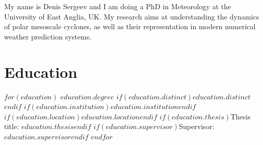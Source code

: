 \documentclass[]{deedy-resume-openfont}
\begin{document}
\lastupdated

\begin{minipage}[t]{\textwidth}
My name is Denis Sergeev and I am doing a PhD in Meteorology at the University of East Anglia, UK. My research aims at understanding the dynamics of polar mesoscale cyclones, as well as their representation in modern numerical weather prediction systems.
\end{minipage}
\sectionsep

\section{Education}
$for(education)$
%
{$education.degree$}%
{$if(education.distinct)$$education.distinct$$endif$}%
{$if(education.institution)$\emph{$education.institution$}$endif$}%
{$if(education.location)$$education.location$$endif$}%
{$if(education.thesis)$Thesis title: \textbf{$education.thesis$}$endif$}%
{$if(education.supervisor)$Supervisor: $education.supervisor$$endif$}%
$endfor$
\sectionsep
\end{document}
